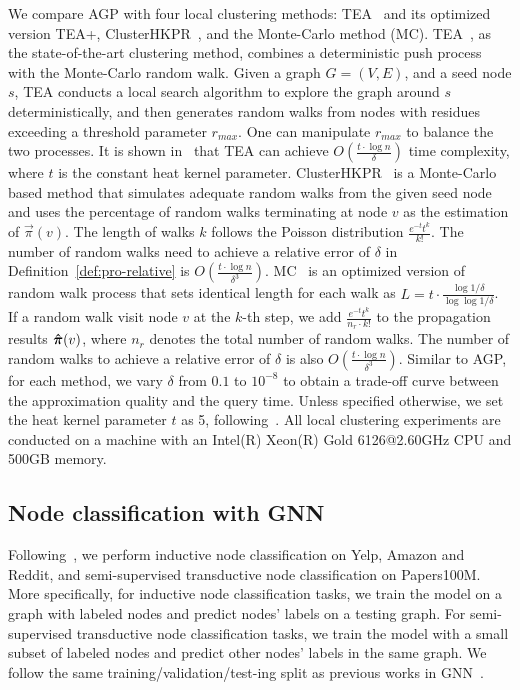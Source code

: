 We compare AGP with four local clustering methods: TEA~\cite{yang2019TEA} and its optimized version TEA+, ClusterHKPR~\cite{chung2018computing}, and the Monte-Carlo method (MC). 
TEA~\cite{yang2019TEA}, as the state-of-the-art clustering method, combines a deterministic push process with the Monte-Carlo random walk. Given a graph $G=(V, E)$, and a seed node $s$, TEA conducts a local search algorithm to explore the graph around $s$ deterministically, and then generates random walks from nodes with residues exceeding a threshold parameter $r_{max}$.  One can manipulate $r_{max}$ to balance the two processes. It is shown in~\cite{yang2019TEA} that TEA can achieve $O\left(\frac{t\cdot \log{n}}{\delta}\right)$ time complexity, where $t$ is the constant heat kernel parameter.
ClusterHKPR~\cite{chung2018computing} is a Monte-Carlo based method that simulates adequate random walks from the given seed node and uses the percentage of random walks terminating at node $v$ as the estimation of $\vec{\pi}(v)$. 
The length of walks $k$ follows the Poisson distribution $\frac{e^{-t}t^k}{k!}$. The number of random walks need to achieve a relative error of $\delta$ in Definition~\ref{def:pro-relative} is $O\left(\frac{t\cdot \log{n}}{\delta^3}\right)$. 
MC~\cite{yang2019TEA} is an optimized version of random walk process that sets identical length for each walk as $L=t\cdot \frac{\log{1/\delta}}{\log{\log{1/\delta}}}$. If a random walk visit node $v$ at the $k$-th step,  we add $\frac{e^{-t}t^k}{n_r \cdot k!}$ to the propagation results $\bm{\bm{\hat{\pi}}}(v)$, where $n_r$ denotes the total number of random walks. The number of random walks to achieve a relative error of $\delta$ is also $O\left(\frac{t\cdot \log{n}}{\delta^3}\right)$. Similar to AGP, for each method, we vary $\delta$ from $0.1$ to $10^{-8}$ to obtain a trade-off curve between the approximation quality and the query time. 
Unless specified otherwise, we set the heat kernel parameter $t$ as 5, following~\cite{kloster2014heat, yang2019TEA}. All local clustering experiments are conducted on a machine with an Intel(R) Xeon(R) Gold 6126@2.60GHz CPU and 500GB memory. 


\subsection{Node classification with GNN}

Following~\cite{zeng2019graphsaint,zou2019layer}, we perform inductive node classification on Yelp, Amazon and Reddit, and semi-supervised transductive node classification on Papers100M. More specifically, for inductive node classification tasks, we train the model on a graph with labeled nodes and predict nodes' labels on a testing graph. For semi-supervised transductive node classification tasks, we train the model with a small subset of labeled nodes and predict other nodes' labels in the same graph. We follow the same training/validation/test-ing split as previous works in GNN~\cite{zeng2019graphsaint,hu2020ogb}. 





